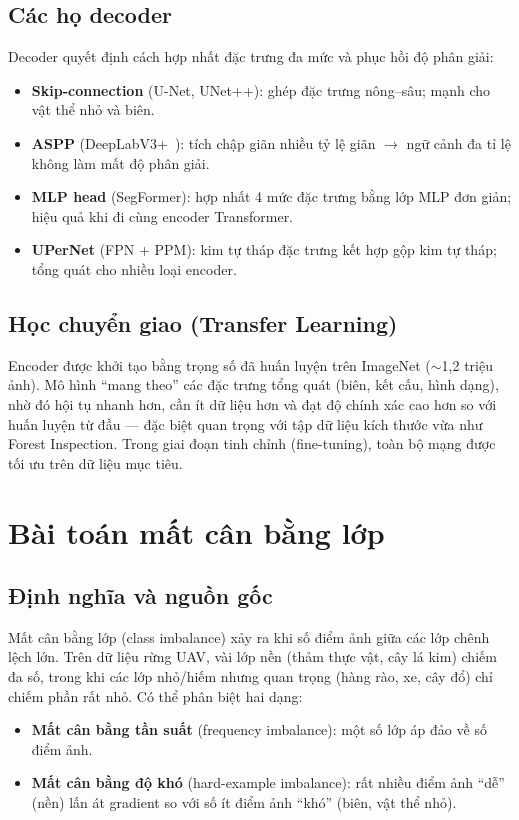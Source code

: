 \subsection{Các họ decoder}
\label{sec:decoders}
Decoder quyết định cách hợp nhất đặc trưng đa mức và phục hồi độ phân giải:
\begin{itemize}[leftmargin=1.4cm]
  \item \textbf{Skip-connection} (U-Net, UNet++): ghép đặc trưng nông--sâu; mạnh cho
  vật thể nhỏ và biên.
  \item \textbf{ASPP} (DeepLabV3+~\cite{chen2018deeplabv3plus}): tích chập giãn nhiều
  tỷ lệ giãn $\rightarrow$ ngữ cảnh đa tỉ lệ không làm mất độ phân giải.
  \item \textbf{MLP head} (SegFormer): hợp nhất 4 mức đặc trưng bằng lớp MLP đơn giản;
  hiệu quả khi đi cùng encoder Transformer.
  \item \textbf{UPerNet} (FPN + PPM): kim tự tháp đặc trưng kết hợp gộp kim tự tháp;
  tổng quát cho nhiều loại encoder.
\end{itemize}

\subsection{Học chuyển giao (Transfer Learning)}
Encoder được khởi tạo bằng trọng số đã huấn luyện trên ImageNet ($\sim$1{,}2 triệu
ảnh). Mô hình ``mang theo'' các đặc trưng tổng quát (biên, kết cấu, hình dạng), nhờ đó
hội tụ nhanh hơn, cần ít dữ liệu hơn và đạt độ chính xác cao hơn so với huấn luyện từ
đầu --- đặc biệt quan trọng với tập dữ liệu kích thước vừa như Forest Inspection. Trong
giai đoạn tinh chỉnh (fine-tuning), toàn bộ mạng được tối ưu trên dữ liệu mục tiêu.

\section{Bài toán mất cân bằng lớp}
\label{sec:imbalance}

\subsection{Định nghĩa và nguồn gốc}
Mất cân bằng lớp (class imbalance) xảy ra khi số điểm ảnh giữa các lớp chênh lệch lớn.
Trên dữ liệu rừng UAV, vài lớp nền (thảm thực vật, cây lá kim) chiếm đa số, trong khi
các lớp nhỏ/hiếm nhưng quan trọng (hàng rào, xe, cây đổ) chỉ chiếm phần rất nhỏ. Có thể
phân biệt hai dạng:
\begin{itemize}[leftmargin=1.4cm]
  \item \textbf{Mất cân bằng tần suất} (frequency imbalance): một số lớp áp đảo về số
  điểm ảnh.
  \item \textbf{Mất cân bằng độ khó} (hard-example imbalance): rất nhiều điểm ảnh
  ``dễ'' (nền) lấn át gradient so với số ít điểm ảnh ``khó'' (biên, vật thể nhỏ).
\end{itemize}

